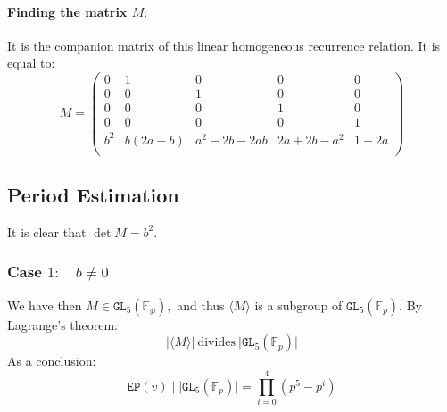 \documentclass[]{article}
\begin{document}
\paragraph{Finding the matrix $M:$} It is the companion matrix of this linear homogeneous recurrence relation. It is equal to:
\begin{equation*}
	M=\begin{pmatrix}
		 0 & 1 & 0 & 0 & 0 \\
		 0 & 0 & 1 & 0 & 0 \\
		 0 & 0 & 0 & 1 & 0 \\
		 0 & 0 & 0 & 0 & 1 \\
		 b^2 & b(2a-b) & a^2-2b-2ab & 2a+2b-a^2 & 1+2a \\
	\end{pmatrix}
\end{equation*}
\subsection{Period Estimation}
It is clear that $\det M=b^2.$ 
\subsubsection{Case $1: \quad b\neq 0$}
We have then $M\in\mathtt{GL}_5(\mathbb{F_p}),$ and thus $\langle M \rangle$ is a subgroup of $\mathtt{GL}_5(\mathbb{F}_p).$ By Lagrange's theorem:
$$
\lvert \langle M \rangle \rvert \ \text{divides} \ \lvert\mathtt{GL}_5(\mathbb{F}_p) \rvert 
$$
As a conclusion:
$$
\mathtt{EP}(v) \mid  \lvert\mathtt{GL}_5(\mathbb{F}_p) \rvert  = \prod_{i=0}^4 (p^5-p^i)
$$
\end{document}

